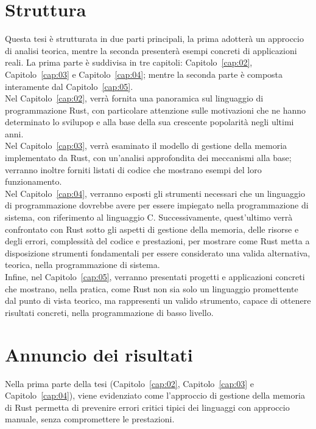 \section{Struttura} 
Questa tesi è strutturata in due parti principali, la prima adotterà un approccio di analisi teorica, mentre 
la seconda presenterà esempi concreti di applicazioni reali.
La prima parte è suddivisa in tre capitoli: Capitolo~\ref{cap:02}, Capitolo~\ref{cap:03} e Capitolo~\ref{cap:04}; mentre la seconda parte è composta interamente dal Capitolo~\ref{cap:05}. \hfill
\vspace{7pt}\\
\noindent Nel Capitolo~\ref{cap:02}, verrà fornita una panoramica sul linguaggio di programmazione Rust, con particolare attenzione sulle motivazioni 
che ne hanno determinato lo svilupop e alla base della sua crescente popolarità negli ultimi anni. \hfill
\vspace{7pt}\\
\noindent Nel Capitolo~\ref{cap:03}, verrà esaminato il modello di gestione della memoria implementato da Rust,
con un'analisi approfondita dei meccanismi alla base; verranno inoltre forniti listati di codice che mostrano esempi del loro funzionamento. \hfill
\vspace{7pt}\\
\noindent Nel Capitolo~\ref{cap:04}, verranno esposti gli strumenti necessari che un linguaggio di programmazione dovrebbe avere per essere impiegato 
nella programmazione di sistema, con riferimento al linguaggio C. 
Successivamente, quest'ultimo verrà confrontato con Rust sotto gli aspetti di 
gestione della memoria, delle risorse e degli errori, complessità del codice e prestazioni, per mostrare come Rust metta a disposizione strumenti 
fondamentali per essere considerato una valida alternativa, teorica, nella programmazione di sistema. \hfill
\vspace{7pt}\\
\noindent Infine, nel Capitolo~\ref{cap:05}, verranno presentati progetti e applicazioni concreti che mostrano, nella pratica, come 
Rust non sia solo un linguaggio promettente dal punto di vista teorico, ma rappresenti un valido strumento, capace di ottenere risultati concreti, nella programmazione di basso livello.

\section{Annuncio dei risultati}
Nella prima parte della tesi (Capitolo~\ref{cap:02}, Capitolo~\ref{cap:03} e Capitolo~\ref{cap:04}), viene evidenziato come l'approccio di gestione della memoria di Rust permetta 
di prevenire errori critici tipici dei linguaggi con approccio manuale, senza compromettere le prestazioni.

